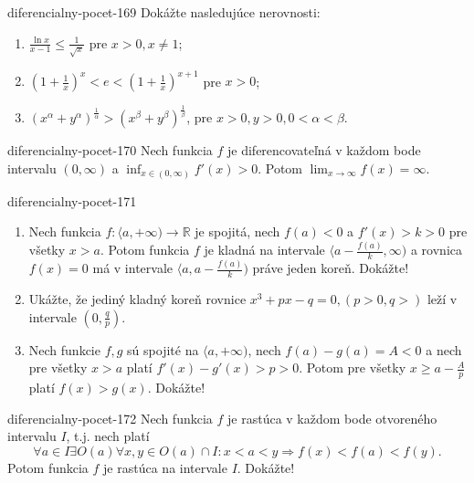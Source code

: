 \begin{defproblem}{diferencialny-pocet-169}
Dokážte nasledujúce nerovnosti:
\begin{multicols}{2}
\begin{enumerate}
    \item $\frac{\ln x}{x-1}\leq \frac{1}{\sqrt{x}}$ pre $x>0,x\neq 1$;
	\item $(1+\frac{1}{x})^x<e<(1+\frac{1}{x})^{x+1}$ pre $x>0$;
	\item $(x^{\alpha}+y^{\alpha})^{\frac{1}{\alpha}}>(x^{\beta}+y^{\beta})^{\frac{1}{\beta}}$, pre $x>0,y>0,0<\alpha<\beta$.
\end{enumerate}
\end{multicols}
\end{defproblem}

\begin{defproblem}{diferencialny-pocet-170}
Nech funkcia $f$ je diferencovateľná v každom bode intervalu $(0,\infty)$ a $\inf_{x\in (0,\infty)}f'(x)>0$. Potom $\lim_{x\rightarrow\infty}f(x)=\infty$.
\end{defproblem}

\begin{defproblem}{diferencialny-pocet-171}
\begin{enumerate}
\item Nech funkcia $f:\langle a,+\infty )\rightarrow\mathbb{R}$ je spojitá, nech $f(a)<0$ a $f'(x)>k>0$ pre všetky $x>a$. Potom funkcia $f$ je kladná na intervale $\langle a-\frac{f(a)}{k},\infty )$ a rovnica $f(x)=0$ má v intervale $\langle a,a-\frac{f(a)}{k} )$ práve jeden koreň. Dokážte!
\item Ukážte, že jediný kladný koreň rovnice $x^3+px-q=0,(p>0,q>)$ leží v intervale $(0,\frac{q}{p})$.
\item Nech funkcie $f,g$ sú spojité na $\langle a,+\infty)$, nech $f(a)-g(a)=A<0$ a nech pre všetky $x>a$ platí $f'(x)-g'(x)>p>0$. Potom pre všetky $x\geq a-\frac{A}{p}$ platí $f(x)>g(x)$. Dokážte!
\end{enumerate}
\end{defproblem}

\begin{defproblem}{diferencialny-pocet-172}
Nech funkcia $f$ je rastúca v každom bode otvoreného intervalu $I$, t.j. nech platí $$\forall a\in I \exists O(a) \forall x,y\in O(a)\cap I: x<a<y\Rightarrow f(x)<f(a)<f(y).$$
Potom funkcia $f$ je rastúca na intervale $I$. Dokážte!
\end{defproblem}


